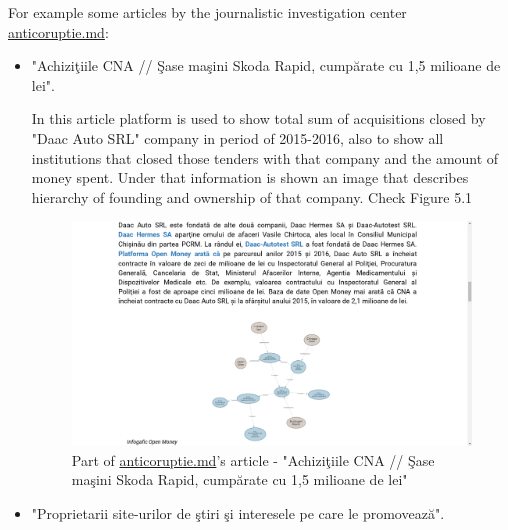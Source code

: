 \documentclass[12pt,a4paper,titlepage]{article}
\begin{document}
For example some articles by the journalistic investigation center \underline{anticoruptie.md}:

\begin{itemize}
\item "Achiziţiile CNA // Şase maşini Skoda Rapid, cumpărate cu 1,5 milioane de lei".

In this article platform is used to show total sum of acquisitions closed by "Daac Auto SRL" company in period of 2015-2016, also to show all institutions that closed those tenders with that company and the amount of money spent. Under that information is shown an image that describes hierarchy of founding and ownership of that company. Check Figure 5.1

\begin{figure}[!ht] 
	\renewcommand\thefigure{5.1} %
	\centering 
	\includegraphics[width=17cm]{ac1.png} 
	\caption{ Part of \underline{anticoruptie.md}'s article - "Achiziţiile CNA // Şase maşini Skoda Rapid, cumpărate cu 1,5 milioane de lei" }\label{fig4} 
	\end{figure}
	
\item "Proprietarii site-urilor de ştiri şi interesele pe care le promovează".


\end{itemize}
\end{document}

